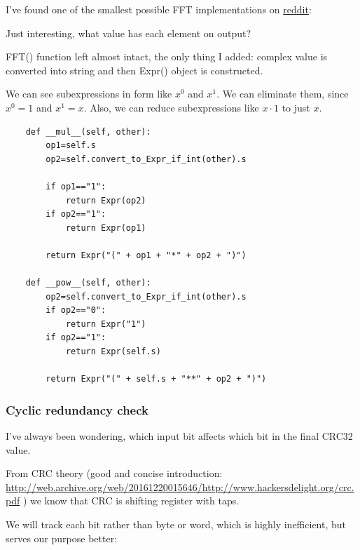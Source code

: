 I've found one of the smallest possible FFT implementations on \href{https://www.reddit.com/r/Python/comments/1la4jp/understanding_the_fft_algorithm_with_python/}{reddit}:



Just interesting, what value has each element on output?



FFT() function left almost intact, the only thing I added: complex value is converted into string and then
Expr() object is constructed.



We can see subexpressions in form like $x^0$ and $x^1$.
We can eliminate them, since $x^0=1$ and $x^1=x$.
Also, we can reduce subexpressions like $x \cdot 1$ to just $x$.

\begin{lstlisting}
    def __mul__(self, other):
        op1=self.s
        op2=self.convert_to_Expr_if_int(other).s

        if op1=="1":
            return Expr(op2)
        if op2=="1":
            return Expr(op1)

        return Expr("(" + op1 + "*" + op2 + ")")

    def __pow__(self, other):
        op2=self.convert_to_Expr_if_int(other).s
        if op2=="0":
            return Expr("1")
        if op2=="1":
            return Expr(self.s)

        return Expr("(" + self.s + "**" + op2 + ")")
\end{lstlisting}



\subsubsection{Cyclic redundancy check}

I've always been wondering, which input bit affects which bit in the final CRC32 value.

From CRC theory (good and concise introduction:
\url{http://web.archive.org/web/20161220015646/http://www.hackersdelight.org/crc.pdf}
) we know that CRC is shifting register with taps.

We will track each bit rather than byte or word, which is highly inefficient, but serves our purpose better:



